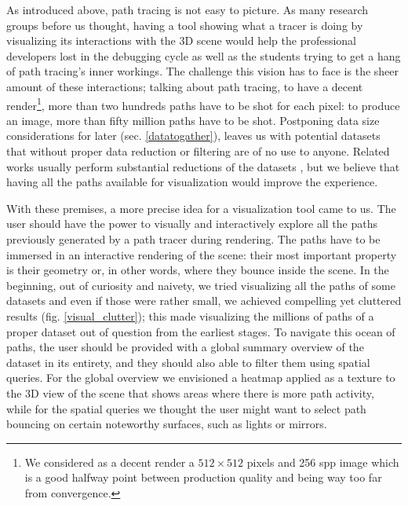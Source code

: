 As introduced above, path tracing is not easy to picture. As many research groups before us thought, having a tool showing what a tracer is doing by visualizing its interactions with the 3D scene would help the professional developers lost in the debugging cycle as well as the students trying to get a hang of path tracing's inner workings. The challenge this vision has to face is the sheer amount of these interactions; talking about path tracing, to have a decent render\footnote{We considered as a decent render a $512 \times 512$ pixels and 256 spp image which is a good halfway point between production quality and being way too far from convergence.}, more than two hundreds paths have to be shot for each pixel: to produce an image, more than fifty million paths have to be shot. Postponing data size considerations for later (sec. \ref{datatogather}), leaves us with potential datasets that without proper data reduction or filtering are of no use to anyone. Related works usually perform substantial reductions of the datasets \cite{simons2019applying,EMCA@2019}, but we believe that having all the paths available for visualization would improve the experience.

With these premises, a more precise idea for a visualization tool came to us. 
The user should have the power to visually and interactively explore all the paths previously generated by a path tracer during rendering. The paths have to be immersed in an interactive rendering of the scene: their most important property is their geometry or, in other words, where they bounce inside the scene. In the beginning, out of curiosity and naivety, we tried visualizing all the paths of some datasets and even if those were rather small, we achieved compelling yet cluttered results (fig. \ref{visual_clutter}); this made visualizing the millions of paths of a proper dataset out of question from the earliest stages. To navigate this ocean of paths, the user should be provided with a global summary overview of the dataset in its entirety, and they should also able to filter them using spatial queries. For the global overview we envisioned a heatmap applied as a texture to the 3D view of the scene that shows areas where there is more path activity, while for the spatial queries we thought the user might want to select path bouncing on certain noteworthy surfaces, such as lights or mirrors. 


